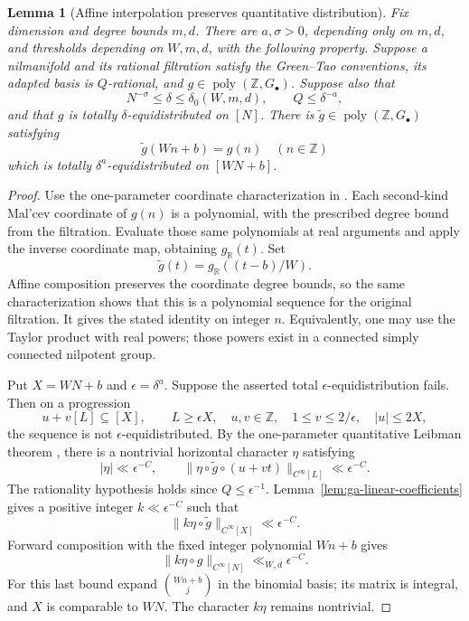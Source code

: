\documentclass[11pt]{article}
\newtheorem{lemma}[theorem]{Lemma}
\theoremstyle{definition}
\theoremstyle{remark}
\begin{document}
\begin{lemma}[Affine interpolation preserves quantitative distribution]
\label{lem:ga-affine-interpolation}
Fix dimension and degree bounds $m,d$. There are $a,\sigma>0$, depending
only on $m,d$, and thresholds depending on $W,m,d$, with the following
property. Suppose a nilmanifold and its rational filtration satisfy the
Green--Tao conventions, its adapted basis is $Q$-rational, and
$g\in\operatorname{poly}(\mathbb Z,G_\bullet)$. Suppose also that
\[
 N^{-\sigma}\leq\delta\leq\delta_0(W,m,d),\qquad
 Q\leq\delta^{-a},
\]
and that $g$ is totally $\delta$-equidistributed on $[N]$. There is
$\widetilde g\in\operatorname{poly}(\mathbb Z,G_\bullet)$ satisfying
\[
 \widetilde g(Wn+b)=g(n)\quad(n\in\mathbb Z)
\]
which is totally $\delta^a$-equidistributed on $[WN+b]$.
\end{lemma}
\begin{proof}
Use the one-parameter coordinate characterization in
\cite[Lemma 6.7]{GTOrbits2012}. Each second-kind Mal'cev coordinate of
$g(n)$ is a polynomial, with the prescribed degree bound from the
filtration. Evaluate those same polynomials at real arguments and apply
the inverse coordinate map, obtaining $g_{\mathbb R}(t)$. Set
\[
 \widetilde g(t)=g_{\mathbb R}((t-b)/W).
\]
Affine composition preserves the coordinate degree bounds, so the same
characterization shows that this is a polynomial sequence for the
original filtration. It gives the stated identity on integer $n$.
Equivalently, one may use the Taylor product with real powers; those
powers exist in a connected simply connected nilpotent group.

Put $X=WN+b$ and $\epsilon=\delta^a$. Suppose the asserted total
$\epsilon$-equidistribution fails. Then on a progression
\[
 u+v[L]\subseteq[X],\qquad L\geq\epsilon X,
 \quad u,v\in\mathbb Z,\quad
 1\leq v\leq2/\epsilon,\quad |u|\leq2X,
\]
the sequence is not $\epsilon$-equidistributed. By the one-parameter
quantitative Leibman theorem \cite[Theorem 2.9]{GTOrbits2012}, there is
a nontrivial horizontal character $\eta$ satisfying
\[
 |\eta|\ll\epsilon^{-C},\qquad
 \|\eta\circ\widetilde g\circ(u+vt)\|_{C^\infty[L]}
       \ll\epsilon^{-C}.
\]
The rationality hypothesis holds since $Q\leq\epsilon^{-1}$.
Lemma~\ref{lem:ga-linear-coefficients} gives a positive integer
$k\ll\epsilon^{-C}$ such that
\[
 \|k\eta\circ\widetilde g\|_{C^\infty[X]}
      \ll\epsilon^{-C}.
\]
Forward composition with the fixed integer polynomial $Wn+b$ gives
\[
 \|k\eta\circ g\|_{C^\infty[N]}
      \ll_{W,d}\epsilon^{-C}.
\]
For this last bound expand $\binom{Wn+b}j$ in the binomial basis; its
matrix is integral, and $X$ is comparable to $WN$. The character
$k\eta$ remains nontrivial.


\end{proof}
\end{document}
